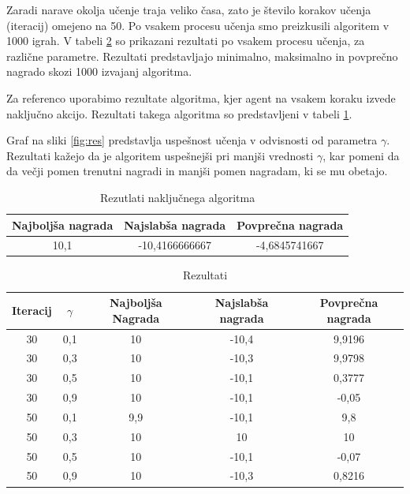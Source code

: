 \documentclass[a4paper]{article}
\begin{document}
Zaradi narave okolja učenje traja veliko časa, zato je število korakov učenja (iteracij) omejeno na 50. Po vsakem procesu učenja smo preizkusili algoritem v 1000 igrah. V tabeli \ref{table:resultsx} so prikazani rezultati po vsakem procesu učenja, za različne parametre. Rezultati predstavljajo minimalno, maksimalno in povprečno nagrado skozi 1000 izvajanj algoritma.

Za referenco uporabimo rezultate algoritma, kjer agent na vsakem koraku izvede naključno akcijo. Rezultati takega algoritma so predstavljeni v tabeli \ref{table:rnd}.

Graf na sliki \ref{fig:res} predstavlja uspešnost učenja v odvisnosti od parametra $\gamma$. Rezultati kažejo da je algoritem uspešnejši pri manjši vrednosti $\gamma$, kar pomeni da da večji pomen trenutni nagradi in manjši pomen nagradam, ki se mu obetajo.

\begin{table}[H]
	\centering
	\begin{tabular}{|c|c|c|}
    \hline
    Najboljša nagrada & Najslabša nagrada & Povprečna nagrada \\\hline
    10,1 & -10,4166666667 & -4,6845741667 \\\hline
    \end{tabular}
   	\caption{Rezutlati naključnega algoritma}
    \label{table:rnd}
\end{table}

\begin{table}[H]
  \begin{tabular}{|c|c|c|c|c|}
  \hline
  Iteracij & $\gamma$ & Najboljša Nagrada & Najslabša nagrada & Povprečna nagrada \\\hline
  30         & 0,1   & 10          & -10,4        & 9,9196         \\
  30         & 0,3   & 10          & -10,3        & 9,9798         \\
  30         & 0,5   & 10          & -10,1        & 0,3777         \\
  30         & 0,9   & 10          & -10,1        & -0,05          \\\hline
  50         & 0,1   & 9,9         & -10,1        & 9,8            \\
  50         & 0,3   & 10          & 10           & 10             \\
  50         & 0,5   & 10          & -10,1        & -0,07          \\
  50         & 0,9   & 10          & -10,3        & 0,8216        \\\hline
  \end{tabular}
  \caption{Rezultati}
  \label{table:resultsx}
\end{table}
\end{document}
